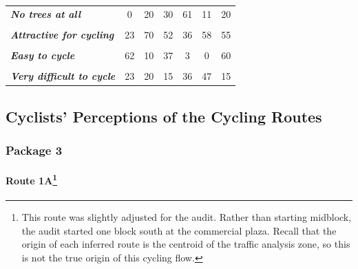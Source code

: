 \documentclass[]{elsarticle} %
\begin{document}
\begin{table}
{\begin{tabular}[t]{>{}lcccccc}
\em{\textbf{No trees at all}} & 0 & 20 & 30 & 61 & 11 & 20\\
\em{\textbf{\cellcolor{gray!6}{Very attractive for cycling}}} & \cellcolor{gray!6}{54} & \cellcolor{gray!6}{10} & \cellcolor{gray!6}{11} & \cellcolor{gray!6}{3} & \cellcolor{gray!6}{0} & \cellcolor{gray!6}{20}\\
\addlinespace
\em{\textbf{Attractive for cycling}} & 23 & 70 & 52 & 36 & 58 & 55\\
\em{\textbf{\cellcolor{gray!6}{Not attractive at all for cycling}}} & \cellcolor{gray!6}{23} & \cellcolor{gray!6}{20} & \cellcolor{gray!6}{37} & \cellcolor{gray!6}{61} & \cellcolor{gray!6}{42} & \cellcolor{gray!6}{25}\\
\em{\textbf{Easy to cycle}} & 62 & 10 & 37 & 3 & 0 & 60\\
\em{\textbf{\cellcolor{gray!6}{Moderately difficult to cycle}}} & \cellcolor{gray!6}{15} & \cellcolor{gray!6}{70} & \cellcolor{gray!6}{48} & \cellcolor{gray!6}{61} & \cellcolor{gray!6}{53} & \cellcolor{gray!6}{25}\\
\em{\textbf{Very difficult to cycle}} & 23 & 20 & 15 & 36 & 47 & 15\\
\bottomrule
\end{tabular}}
\end{table}

\hypertarget{cyclists-perceptions-of-the-cycling-routes}{%
\subsection{Cyclists' Perceptions of the Cycling
Routes}\label{cyclists-perceptions-of-the-cycling-routes}}

\hypertarget{package-3}{%
\subsubsection{Package 3}\label{package-3}}

\hypertarget{route-1a}{%
\paragraph[Route 1A]{\texorpdfstring{Route 1A\footnote{This route was
  slightly adjusted for the audit. Rather than starting midblock, the
  audit started one block south at the commercial plaza. Recall that the
  origin of each inferred route is the centroid of the traffic analysis
  zone, so this is not the true origin of this cycling flow.}}{Route 1A}}\label{route-1a}}
\end{document}

